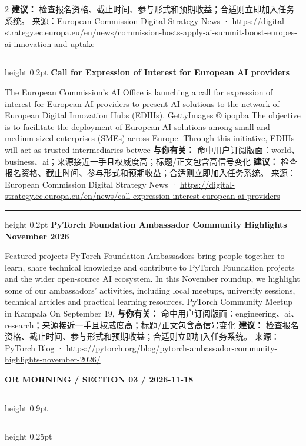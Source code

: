 \documentclass[10.5pt]{ctexart}
\begin{document}
\begin{multicols}{2}
\textbf{建议：} 检查报名资格、截止时间、参与形式和预期收益；合适则立即加入任务系统。
{\footnotesize\color{ormuted} 来源：European Commission Digital Strategy News · \url{https://digital-strategy.ec.europa.eu/en/news/commission-hosts-apply-ai-summit-boost-europes-ai-innovation-and-uptake}}
\vspace{2mm}
\hrule height 0.2pt
\vspace{2mm}
{\large\bfseries Call for Expression of Interest for European AI providers}\par
The European Commission’s AI Office is launching a call for expression of interest for European AI providers to present AI solutions to the network of European Digital Innovation Hubs (EDIHs). GettyImages © ipopba The objective is to facilitate the deployment of European AI solutions among small and medium-sized enterprises (SMEs) across Europe. Through this initiative, EDIHs will act as trusted intermediaries betwee
\textbf{与你有关：} 命中用户订阅版面：world、business、ai；来源接近一手且权威度高；标题/正文包含高信号变化
\textbf{建议：} 检查报名资格、截止时间、参与形式和预期收益；合适则立即加入任务系统。
{\footnotesize\color{ormuted} 来源：European Commission Digital Strategy News · \url{https://digital-strategy.ec.europa.eu/en/news/call-expression-interest-european-ai-providers}}
\vspace{2mm}
\hrule height 0.2pt
\vspace{2mm}
{\large\bfseries PyTorch Foundation Ambassador Community Highlights November 2026}\par
Featured projects PyTorch Foundation Ambassadors bring people together to learn, share technical knowledge and contribute to PyTorch Foundation projects and the wider open-source AI ecosystem. In this November roundup, we highlight some of our ambassadors’ activities, including local meetups, university sessions, technical articles and practical learning resources. PyTorch Community Meetup in Kampala On September 19,
\textbf{与你有关：} 命中用户订阅版面：engineering、ai、research；来源接近一手且权威度高；标题/正文包含高信号变化
\textbf{建议：} 检查报名资格、截止时间、参与形式和预期收益；合适则立即加入任务系统。
{\footnotesize\color{ormuted} 来源：PyTorch Blog · \url{https://pytorch.org/blog/pytorch-ambassador-community-highlights-november-2026/}}
\end{multicols}
\newpage
{\small\bfseries OR MORNING / SECTION 03 / 2026-11-18}
\vspace{2mm}
\hrule height 0.9pt
\vspace{1.5mm}
\hrule height 0.25pt
\vspace{4mm}
\end{document}
